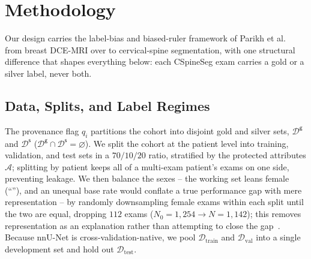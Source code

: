 \section{Methodology}
\label{sec:methodology}

Our design carries the label-bias and biased-ruler framework of Parikh et
al.~\cite{parikh2025labelbias,parikh2025whofails} from breast DCE-MRI over to
cervical-spine segmentation, with one structural difference that shapes everything
below: each CSpineSeg exam carries a gold or a silver label, never both.

\subsection{Data, Splits, and Label Regimes}
\label{sec:regimes}

The provenance flag $q_i$ partitions the cohort into disjoint gold and silver
sets, $\mathcal{D}^{\mathsf{g}}$ and $\mathcal{D}^{\mathsf{s}}$
($\mathcal{D}^{\mathsf{g}} \cap \mathcal{D}^{\mathsf{s}} = \varnothing$). We split
the cohort at the patient level into training, validation, and test sets in a
$70/10/20$ ratio, stratified by the protected attributes $\mathcal{A}$; splitting
by patient keeps
all of a multi-exam patient's exams on one side, preventing leakage. We then
balance the sexes -- the working set leans female (``''), and
an unequal base rate would conflate a true performance gap with mere
representation -- by randomly downsampling female exams within each split until the
two are equal, dropping $112$ exams ($N_0 = 1{,}254 \to N = 1{,}142$); this removes
representation as an explanation rather than attempting to close the
gap~\cite{parikh2025labelbias}. Because nnU-Net is cross-validation-native, we pool
$\mathcal{D}_{\mathrm{train}}$ and $\mathcal{D}_{\mathrm{val}}$ into a single
development set and hold out $\mathcal{D}_{\mathrm{test}}$.

